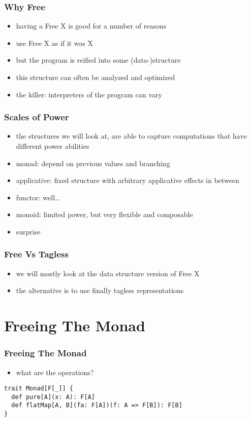\documentclass{beamer}
\begin{document}
\begin{frame}
  \frametitle{Why Free}
  \begin{itemize}
  \item having a Free X is good for a number of reasons
  \item use Free X as if it was X
  \item but the program is reified into some (data-)structure
  \item this structure can often be analyzed and optimized
  \item the killer: interpreters of the program can vary
  \end{itemize}
\end{frame}

\begin{frame}
  \frametitle{Scales of Power}
  \begin{itemize}
  \item the structures we will look at, are able to capture computations that have different power abilities
  \item monad: depend on previous values and branching
  \item applicative: fixed structure with arbitrary applicative effects in between
  \item functor: well\ldots
  \item monoid: limited power, but very flexible and composable
  \item surprise
  \end{itemize}
\end{frame}

\begin{frame}
  \frametitle{Free Vs Tagless}
  \begin{itemize}
  \item we will mostly look at the data structure version of Free X
  \item the alternative is to use finally tagless representations
  \end{itemize}
\end{frame}

\section{Freeing The Monad}\label{sec:free-monad}
\begin{frame}[fragile]
  \frametitle{Freeing The Monad}
  \begin{itemize}
  \item what are the operations?
  \end{itemize}
    \begin{center}
\begin{verbatim}
trait Monad[F[_]] {
  def pure[A](x: A): F[A]
  def flatMap[A, B](fa: F[A])(f: A => F[B]): F[B]
}
\end{verbatim}
\end{center}
\end{frame}
\end{document}
